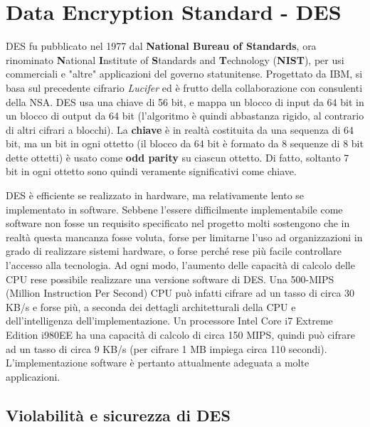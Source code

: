 \section{Data Encryption Standard - DES}
DES fu pubblicato nel 1977 dal \textbf{National Bureau of Standards}, ora rinominato \textbf{N}ational \textbf{I}nstitute of \textbf{S}tandards and \textbf{T}echnology (\textbf{NIST}), per usi commerciali e "altre" applicazioni del governo statunitense. Progettato da IBM, si basa sul precedente cifrario \textit{Lucifer} ed è frutto della collaborazione con consulenti della NSA. DES usa una chiave di 56 bit, e mappa un blocco di input da 64 bit in un blocco di output da 64 bit (l'algoritmo è quindi abbastanza rigido, al contrario di altri cifrari a blocchi). La \textbf{chiave} è in realtà costituita da una sequenza di 64 bit, ma un bit in ogni ottetto (il blocco da 64 bit è formato da 8 sequenze di 8 bit dette ottetti) è usato come \textbf{odd parity} su ciascun ottetto. Di fatto, soltanto 7 bit in ogni ottetto sono quindi veramente significativi come chiave. \newline \newline

DES è efficiente se realizzato in hardware, ma relativamente lento se implementato in software. Sebbene l'essere difficilmente implementabile come software non fosse un requisito specificato nel progetto molti sostengono che in realtà questa mancanza fosse voluta, forse per limitarne l'uso ad organizzazioni in grado di realizzare sistemi hardware, o forse perché rese più facile controllare l'accesso alla tecnologia. Ad ogni modo, l'aumento delle capacità di calcolo delle CPU rese possibile realizzare una versione software di DES. Una 500-MIPS (Million Instruction Per Second) CPU può infatti cifrare ad un tasso di circa 30 KB/s e forse più, a seconda dei dettagli architetturali della CPU e dell'intelligenza dell'implementazione. Un processore Intel Core i7 Extreme Edition i980EE ha una capacità di calcolo di circa 150 MIPS, quindi può cifrare ad un tasso di circa 9 KB/s (per cifrare 1 MB impiega circa 110 secondi). L’implementazione software è pertanto attualmente adeguata a molte applicazioni.\newline \newline


\subsection{Violabilità e sicurezza di DES}

